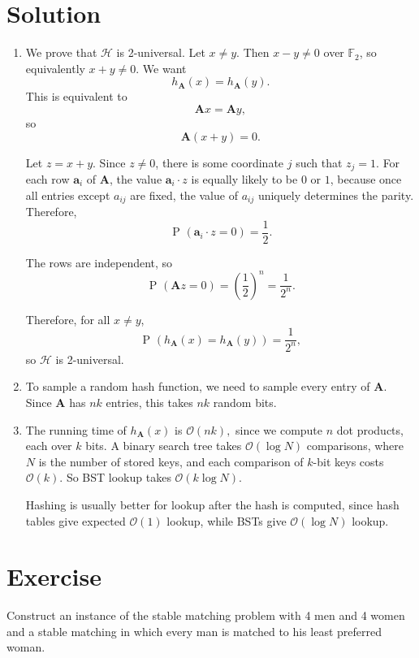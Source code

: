 \documentclass[14pt]{extreport}
\newcounter{counter}
\newcommand{\Exercise}{Exercise \stepcounter{counter}\thecounter}
\renewcommand{\Pr}[2][]{\operatorname{P}_{#1}\left(#2\right)}
\begin{document}
\section*{Solution}
    \begin{enumerate}
        \item We prove that $\mathcal{H}$ is 2-universal. Let $x \neq y$. Then $x - y \neq 0$ over $\mathbb{F}_2$, so equivalently $x + y \neq 0$. We want
        $$h_{\bm{A}}(x) = h_{\bm{A}}(y).$$
        This is equivalent to
        $$\bm{A}x = \bm{A}y,$$
        so
        $$\bm{A}(x + y) = 0.$$

        Let $z = x + y$. Since $z \neq 0$, there is some coordinate $j$ such that $z_j = 1$. For each row $\bm{a}_i$ of $\bm{A}$, the value $\bm{a}_i \cdot z$
        is equally likely to be $0$ or $1$, because once all entries except $a_{ij}$ are fixed, the value of $a_{ij}$ uniquely determines the parity. Therefore,
        $$\Pr{\bm{a}_i \cdot z = 0} = \frac{1}{2}.$$

        The rows are independent, so
        $$\Pr{\bm{A}z = 0} = \left(\frac{1}{2}\right)^n = \frac{1}{2^n}.$$

        Therefore, for all $x \neq y$,
        $$\Pr{h_{\bm{A}}(x) = h_{\bm{A}}(y)} = \frac{1}{2^n},$$
        so $\mathcal{H}$ is 2-universal.

        \item To sample a random hash function, we need to sample every entry of $\bm{A}$. Since $\bm{A}$ has $nk$ entries, this takes $nk$
        random bits.

        \item The running time of $h_{\bm{A}}(x)$ is
        $\mathcal{O}(nk),$
        since we compute $n$ dot products, each over $k$ bits. A binary search tree takes $\mathcal{O}(\log N)$ comparisons, where $N$ is the number of stored keys, and each comparison of $k$-bit keys costs $\mathcal{O}(k)$. So BST lookup takes $\mathcal{O}(k \log N).$

        \vspace{2mm}
        Hashing is usually better for lookup after the hash is computed, since hash tables give expected $\mathcal{O}(1)$ lookup, while BSTs give $\mathcal{O}(\log N)$ lookup.
    \end{enumerate}

\section*{\Exercise}
    Construct an instance of the stable matching problem with 4 men and 4 women and a stable matching in which every man is matched to his least preferred woman.
\end{document}
